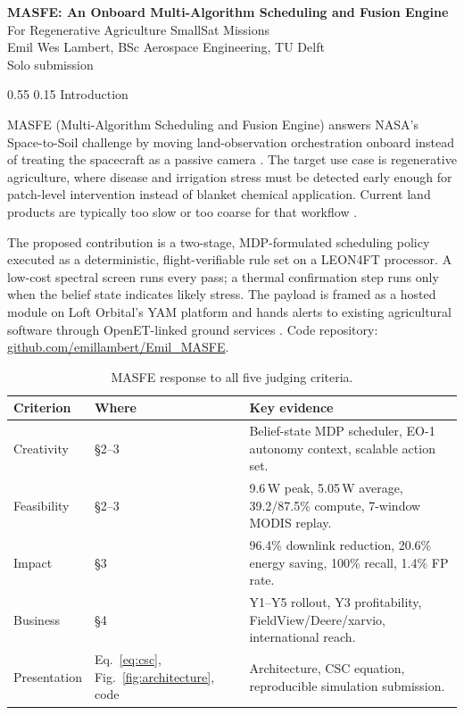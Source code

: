 \documentclass[11pt,letterpaper]{article}
\makeatletter
\renewcommand\section{\@startsection{section}{1}{\z@}
  {0.55\baselineskip}
  {0.15\baselineskip}
  {\normalfont\large\bfseries}}
\renewcommand{\arraystretch}{1.15}
\makeatother
\begin{document}
\thispagestyle{fancy}

\begin{center}
{\LARGE\bfseries MASFE: An Onboard Multi-Algorithm Scheduling and Fusion Engine}\\[2pt]
{\large For Regenerative Agriculture SmallSat Missions}\\[3pt]
Emil Wes Lambert, BSc Aerospace Engineering, TU Delft\\
Solo submission
\end{center}

\section{Introduction}

MASFE (Multi-Algorithm Scheduling and Fusion Engine) answers NASA's Space-to-Soil challenge by moving land-observation orchestration onboard instead of treating the spacecraft as a passive camera \cite{nasa-challenge-brief}. The target use case is regenerative agriculture, where disease and irrigation stress must be detected early enough for patch-level intervention instead of blanket chemical application. Current land products are typically too slow or too coarse for that workflow \cite{gold-webinar1,mod13a1,mod11a1}.

The proposed contribution is a two-stage, MDP-formulated scheduling policy executed as a deterministic, flight-verifiable rule set on a LEON4FT processor. A low-cost spectral screen runs every pass; a thermal confirmation step runs only when the belief state indicates likely stress. The payload is framed as a hosted module on Loft Orbital's YAM platform and hands alerts to existing agricultural software through OpenET-linked ground services \cite{mytkowicz-webinar2,openet-api}. Code repository: \href{https://github.com/emillambert/Emil_MASFE}{github.com/emillambert/Emil\_MASFE}.

\begin{table}[H]
\centering
\caption{MASFE response to all five judging criteria.}
\label{tab:criteria-summary}
\begingroup
\small
\setlength{\tabcolsep}{5pt}
\renewcommand{\arraystretch}{1.1}
\begin{tabularx}{\linewidth}{p{2.2cm}p{3cm}X}
\toprule
\textbf{Criterion} & \textbf{Where} & \textbf{Key evidence} \\
\midrule
Creativity & \S2--3 & Belief-state MDP scheduler, EO-1 autonomy context, scalable action set. \\
Feasibility & \S2--3 & 9.6\,W peak, 5.05\,W average, 39.2/87.5\% compute, 7-window MODIS replay. \\
Impact & \S3 & 96.4\% downlink reduction, 20.6\% energy saving, 100\% recall, 1.4\% FP rate. \\
Business & \S4 & Y1--Y5 rollout, Y3 profitability, FieldView/Deere/xarvio, international reach. \\
Presentation & Eq.~\eqref{eq:csc}, Fig.~\ref{fig:architecture}, code & Architecture, CSC equation, reproducible simulation submission. \\
\bottomrule
\end{tabularx}
\endgroup
\end{table}
\end{document}
